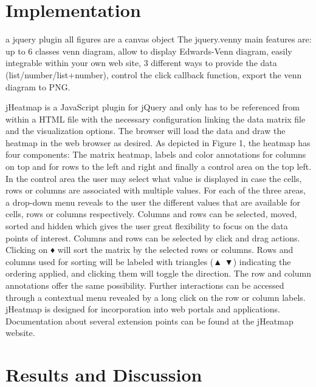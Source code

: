 \documentclass{bmcart}
\begin{document}
\section*{Implementation}
a jquery plugin 
all figures are a canvas object 
The jquery.venny main features are: up to 6 classes venn diagram, allow to display Edwards-Venn diagram, easily integrable 
within your own web site, 3 different ways to provide the data (list/number/list+number), control the click callback function,
export the venn diagram to PNG.

jHeatmap is a JavaScript plugin for jQuery and only has to be
referenced from within a HTML file with the necessary
configuration linking the data matrix file and the visualization
options. The browser will load the data and draw the heatmap in
the web browser as desired.
As depicted in Figure 1, the heatmap has four components: The
matrix heatmap, labels and color annotations for columns on top
and for rows to the left and right and finally a control area on the
top left. In the control area the user may select what value is
displayed in case the cells, rows or columns are associated with
multiple values. For each of the three areas, a drop-down menu
reveals to the user the different values that are available for cells,
rows or columns respectively. Columns and rows can be selected,
moved, sorted and hidden which gives the user great flexibility to
focus on the data points of interest. Columns and rows can be
selected by click and drag actions. Clicking on ♦ will sort the
matrix by the selected rows or columns. Rows and columns used
for sorting will be labeled with triangles (▲ ▼) indicating the
ordering applied, and clicking them will toggle the direction. The
row and column annotations offer the same possibility. Further
interactions can be accessed through a contextual menu revealed
by a long click on the row or column labels.
jHeatmap is designed for incorporation into web portals and
applications. Documentation about several extension points can be
found at the jHeatmap website.

\section*{Results and Discussion}
\end{document}

